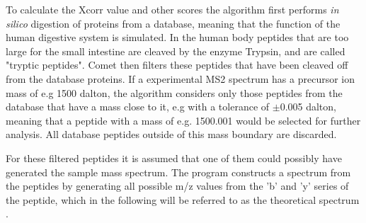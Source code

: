 \documentclass[11pt]{article}
\begin{document}
To calculate the Xcorr value and other scores the algorithm first performs \textit{in silico} digestion of proteins from a database, meaning that the function of the human digestive system is simulated. In the human body peptides that are too large for the small intestine are cleaved by the enzyme Trypsin, and are called "tryptic peptides". Comet then filters these peptides that have been cleaved off from the database proteins. If a experimental MS2 spectrum has a precursor ion mass of e.g 1500 dalton, the algorithm considers only those peptides from the database that have a mass close to it, e.g with a tolerance of  $\pm$0.005 dalton, meaning that a peptide with a mass of e.g. 1500.001 would be selected for further analysis. All database peptides outside of this mass boundary are discarded.

For these filtered peptides it is assumed that one of them could possibly have generated the sample mass spectrum. The program constructs a spectrum from the peptides by generating all possible m/z values from the 'b' and 'y' series of the peptide, which in the following will be referred to as the theoretical spectrum \cite{comet-first-paper}. 
\end{document}
